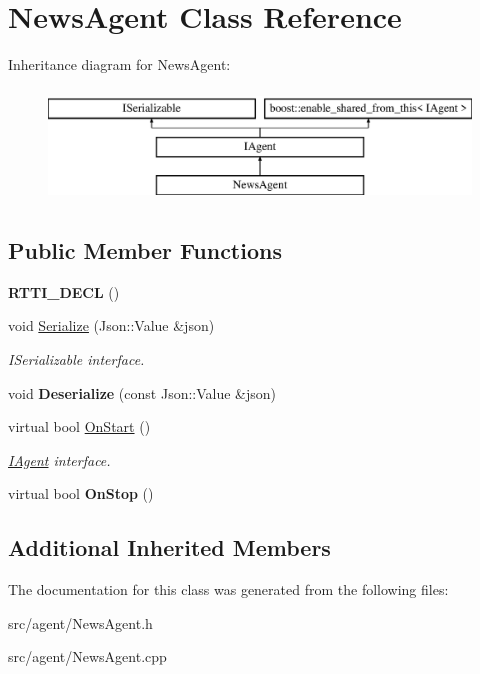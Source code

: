 \hypertarget{class_news_agent}{}\section{News\+Agent Class Reference}
\label{class_news_agent}
Inheritance diagram for News\+Agent\+:\begin{figure}[H]
\begin{center}
\leavevmode
\includegraphics[height=3.000000cm]{class_news_agent}
\end{center}
\end{figure}
\subsection*{Public Member Functions}
\begin{DoxyCompactItemize}
\item 
\mbox{\label{class_news_agent_a8e375c2afaabb0b672a0c192d9f8c7f3}} 
{\bfseries R\+T\+T\+I\+\_\+\+D\+E\+CL} ()
\item 
\mbox{\label{class_news_agent_a22b76c9db22394df5ba478deecc7f690}} 
void \hyperlink{class_news_agent_a22b76c9db22394df5ba478deecc7f690}{Serialize} (Json\+::\+Value \&json)
\begin{DoxyCompactList}\small\item\em I\+Serializable interface. \end{DoxyCompactList}\item 
\mbox{\label{class_news_agent_ad8a236740fb64a1ba99a85663502597d}} 
void {\bfseries Deserialize} (const Json\+::\+Value \&json)
\item 
\mbox{\label{class_news_agent_ae812f9cff4ff50d49fab7411f7d90067}} 
virtual bool \hyperlink{class_news_agent_ae812f9cff4ff50d49fab7411f7d90067}{On\+Start} ()
\begin{DoxyCompactList}\small\item\em \hyperlink{class_i_agent}{I\+Agent} interface. \end{DoxyCompactList}\item 
\mbox{\label{class_news_agent_af10dedb6d83a8da8b4066884e8d93e9c}} 
virtual bool {\bfseries On\+Stop} ()
\end{DoxyCompactItemize}
\subsection*{Additional Inherited Members}


The documentation for this class was generated from the following files\+:\begin{DoxyCompactItemize}
\item 
src/agent/News\+Agent.\+h\item 
src/agent/News\+Agent.\+cpp\end{DoxyCompactItemize}

